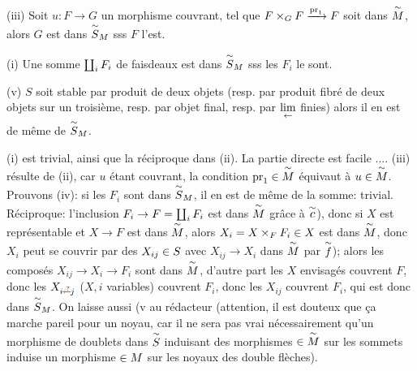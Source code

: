 (iii) Soit $u:F\to G$ un morphisme couvrant, tel que  $F\times_G F\xrightarrow{\mathrm{pr}_1}F$ soit dans $\overset{\sim}{M}$, alors $G$ est dans $\overset{\sim}{S}_M$ sss $F$ l'est.

(i) Une somme $\coprod_iF_i$ de faisdeaux est dans $\overset{\sim}{S}_M$ sss les $F_i$ le sont.

(v)  $S$ soit stable par  produit de deux objets (resp. par produit fibré de deux objets sur un  troisième, resp. par objet final, resp. par $\underset{\leftarrow}{\lim}$ finies) alors il en est de même de $\overset{\sim}{S}_M$.

(i) est trivial,  ainsi que la réciproque dans (ii). La partie directe est facile .... (iii) résulte de (ii), car $u$ étant couvrant, la condition $\mathrm{pr}_1\in \overset{\sim}{M}$ équivaut à $u\in \overset{\sim}{M}$. Prouvons (iv): si les $F_i$ sont dans $\overset{\sim}{S}_M$, il en est de même de la somme: trivial. Réciproque: l'inclusion $F_i\to F=\coprod_iF_i$ est dans $\overset{\sim}{M}$ grâce à $\overset{\sim}{c}$), donc si $X$ est représentable et $X\to F$ est dans $\overset{\sim}{M}$, alors $X_i=X\times_F F_i \in X$ est dans $\overset{\sim}{M}$, donc $X_i$ peut se couvrir par des $X_{ij}\in S$ avec $X_{ij}\to X_i$ dans $\overset{\sim}{M}$ par $\overset{\sim}{f}$); alors les composés $X_{ij}\to X_i\to F_i$ sont dans $\overset{\sim}{M}$, d'autre part les $X$ envisagés couvrent $F$, donc les $X_{i\deleted{\unsure{i}}j}$  ($X,i$ variables) couvrent $F_i$, donc les $X_{ij}$ couvrent $F_i$, qui est donc dans $\overset{\sim}{S}_M$. On laisse aussi (v au rédacteur (attention, il est douteux que ça marche pareil pour un noyau, car il ne sera pas vrai nécessairement qu'un morphisme de doublets dans $\overset{\sim}{S}$  induisant des morphismes $\in \overset{\sim}{M}$ sur les sommets induise un morphisme  $\in M$ sur les noyaux des double flèches).

